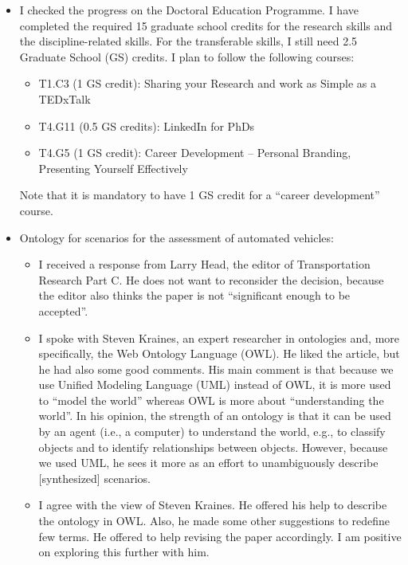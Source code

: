 \documentclass[10pt,final,a4paper,oneside,onecolumn]{article}
\begin{document}
\begin{itemize}
	\item I checked the progress on the Doctoral Education Programme. I have completed the required 15 graduate school credits for the research skills and the discipline-related skills. For the transferable skills, I still need 2.5 Graduate School (GS) credits. I plan to follow the following courses:
	\begin{itemize}
		\item T1.C3 (1 GS credit): Sharing your Research and work as Simple as a TEDxTalk
		\item T4.G11 (0.5 GS credits): LinkedIn for PhDs
		\item T4.G5 (1 GS credit): Career Development -- Personal Branding, Presenting Yourself Effectively
	\end{itemize}
	Note that it is mandatory to have 1 GS credit for a ``career development'' course.
	
	\item Ontology for scenarios for the assessment of automated vehicles:
	\begin{itemize}
		\item I received a response from Larry Head, the editor of Transportation Research Part C. He does not want to reconsider the decision, because the editor also thinks the paper is not ``significant enough to be accepted''.
		
		\item I spoke with Steven Kraines, an expert researcher in ontologies and, more specifically, the Web Ontology Language (OWL). He liked the article, but he had also some good comments. His main comment is that because we use Unified Modeling Language (UML) instead of OWL, it is more used to ``model the world'' whereas OWL is more about ``understanding the world''. In his opinion, the strength of an ontology is that it can be used by an agent (i.e., a computer) to understand the world, e.g., to classify objects and to identify relationships between objects. However, because we used UML, he sees it more as an effort to unambiguously describe [synthesized] scenarios. 
		
		\item I agree with the view of Steven Kraines. He offered his help to describe the ontology in OWL. Also, he made some other suggestions to redefine few terms. He offered to help revising the paper accordingly. I am positive on exploring this further with him. 
		

\end{itemize}
\end{itemize}
\end{document}
